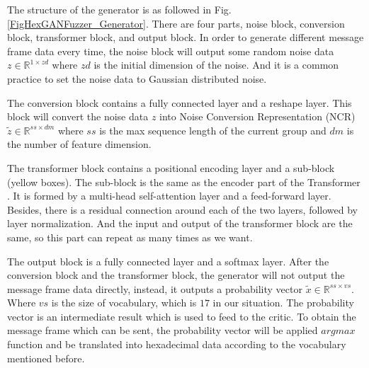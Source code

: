 The structure of the generator is as followed in Fig. \ref{FigHexGANFuzzer_Generator}. There are four parts, noise block, conversion block, transformer block, and output block. In order to generate different message frame data every time, the noise block will output some random noise data $z \in \mathbb{R}^{1 \times zd}$ where $zd$ is the initial dimension of the noise. And it is a common practice to set the noise data to Gaussian distributed noise. 

The conversion block contains a fully connected layer and a reshape layer. This block will convert the noise data $z$ into Noise Conversion Representation (NCR) $\tilde{z} \in \mathbb{R}^{ss \times dm}$ where $ss$ is the max sequence length of the current group and $dm$ is the number of feature dimension.

The transformer block contains a positional encoding layer and a sub-block (yellow boxes). The sub-block is the same as the encoder part of the Transformer \cite{vaswani2017attention}. It is formed by a multi-head self-attention layer and a feed-forward layer. Besides, there is a residual connection around each of the two layers, followed by layer normalization. And the input and output of the transformer block are the same, so this part can repeat as many times as we want.

The output block is a fully connected layer and a softmax layer. After the conversion block and the transformer block, the generator will not output the message frame data directly, instead, it outputs a probability vector $\tilde{x} \in \mathbb{R}^{ss \times vs}$. Where $vs$ is the size of vocabulary, which is $17$ in our situation. The probability vector is an intermediate result which is used to feed to the critic. To obtain the message frame which can be sent, the probability vector will be applied $argmax$ function and be translated into hexadecimal data according to the vocabulary mentioned before.

